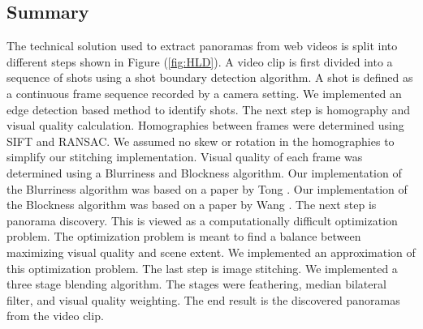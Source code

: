 \subsection{Summary} \label{sec:TechSolSummary}

The technical solution used to extract panoramas from web videos is split into different steps shown in Figure (\ref{fig:HLD}).  
A video clip is first divided into a sequence of shots using a shot boundary detection algorithm.  
A shot is defined as a continuous frame sequence recorded by a camera setting.  We implemented an edge detection based method to identify shots.  
The next step is homography and visual quality calculation.  Homographies between frames were determined using SIFT and RANSAC.  
We assumed no skew or rotation in the homographies to simplify our stitching implementation.  
Visual quality of each frame was determined using a Blurriness and Blockness algorithm.  
Our implementation of the Blurriness algorithm was based on a paper by Tong \cite{Tong}.  
Our implementation of the Blockness algorithm was based on a paper by Wang \cite{Wang}.  The next step is panorama discovery.  
This is viewed as a computationally difficult optimization problem.  
The optimization problem is meant to find a balance between maximizing visual quality and scene extent.  
We implemented an approximation of this optimization problem.  The last step is image stitching.  We implemented a three stage blending algorithm.  
The stages were feathering, median bilateral filter, and visual quality weighting.  The end result is the discovered panoramas from the video clip.


